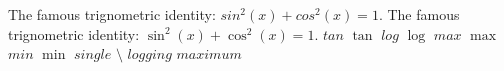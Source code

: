 The famous trignometric identity: $sin^2(x) + cos^2(x) = 1$.
The famous trignometric identity: $\sin^2(x) + \cos^2(x) = 1$.
$tan$
$\tan$
$log$
$\log$
$max$
$\max$
$min$
$\min$
$single$
$\setminus$
$logging$
$maximum$
